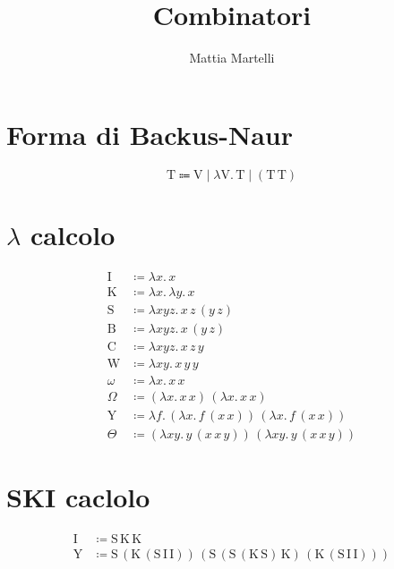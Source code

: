 \documentclass{article}
\author{Mattia Martelli}
\date{}
\title{Combinatori}
\begin{document}
    
    \maketitle

    \section*{Forma di Backus-Naur}

        \[
            \mathrm{T} \Coloneqq \mathrm{V} \; | \; \lambda \mathrm{V} . \, \mathrm{T} \; | \; (\mathrm{T} \, \mathrm{T})
        \]

    \section*{\(\lambda\) calcolo}

        \begin{align*}
            \mathrm{I} &\coloneqq \lambda x . \, x\\
            \mathrm{K} &\coloneqq \lambda x . \, \lambda y . \, x\\
            \mathrm{S} &\coloneqq \lambda xyz . \, x \, z \, (y \, z)\\
            \mathrm{B} &\coloneqq \lambda xyz . \, x \, (y \, z)\\
            \mathrm{C} &\coloneqq \lambda xyz . \, x \, z \, y\\
            \mathrm{W} &\coloneqq \lambda xy . \, x \, y \, y\\
            \omega &\coloneqq \lambda x . \, x \, x\\
            \Omega &\coloneqq (\lambda x . \, x \, x) \, (\lambda x . \, x \, x)\\
            \mathrm{Y} &\coloneqq \lambda f . \, (\lambda x . \, f \, (x \, x)) \, (\lambda x . \, f \, (x \, x))\\
            \Theta &\coloneqq (\lambda xy . \, y \, (x \, x \, y)) \, (\lambda xy . \, y \, (x \, x \, y))
        \end{align*}

    \section*{SKI caclolo}

        \begin{align*}
            \mathrm{I} &\coloneqq \mathrm{S} \, \mathrm{K} \, \mathrm{K}\\
            \mathrm{Y} &\coloneqq \mathrm{S} \, (\mathrm{K} \, (\mathrm{S} \, \mathrm{I} \, \mathrm{I})) \, (\mathrm{S} \, (\mathrm{S} \, (\mathrm{K} \, \mathrm{S}) \, \mathrm{K}) \, (\mathrm{K} \, (\mathrm{S} \, \mathrm{I} \, \mathrm{I})))
        \end{align*}
\end{document}
